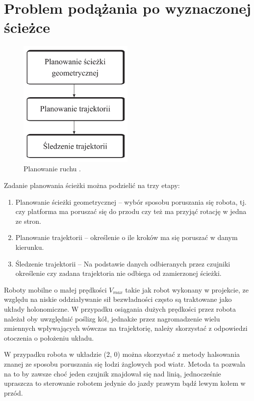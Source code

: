 

\chapter{Problem podążania po wyznaczonej ścieżce}
\begin{figure}[H]
\centering
\includegraphics[width=0.5\textwidth]{inzynierku/img/planowanie.png}
\caption{\label{fig:planowanie}Planowanie ruchu \cite{planowanie_ruchu}.}
\end{figure}
Zadanie planowania ścieżki można podzielić na trzy etapy:
\begin{enumerate}
    \item Planowanie ścieżki geometrycznej -- wybór sposobu poruszania się robota, tj. czy platforma ma poruszać się do przodu czy też ma przyjąć rotację w jedna ze stron.
    \item Planowanie trajektorii -- określenie o ile kroków ma się poruszać w danym kierunku.
    \item Śledzenie trajektorii -- Na podstawie danych odbieranych przez czujniki określenie czy zadana trajektoria nie odbiega od zamierzonej ścieżki.
\end{enumerate}
Roboty mobilne o małej prędkości $V_{max}$ takie jak robot wykonany w projekcie, ze względu na niskie oddziaływanie sił bezwładności często są traktowane jako układy holonomiczne. \cite{planowanie_ruchu} W przypadku osiągania dużych prędkości przez robota należał oby uwzględnić poślizg kół, jednakże przez nagromadzenie wielu zmiennych wpływających wówczas na trajektorię, należy skorzystać z odpowiedzi otoczenia o położeniu układu.

W przypadku robota w układzie (2, 0) można skorzystać z metody halsowania znanej ze sposobu poruszania się łodzi żaglowych pod wiatr. Metoda ta pozwala na to by zawsze choć jeden czujnik znajdował się nad linią, jednocześnie upraszcza to sterowanie robotem jedynie do jazdy prawym bądź lewym kołem w przód.

